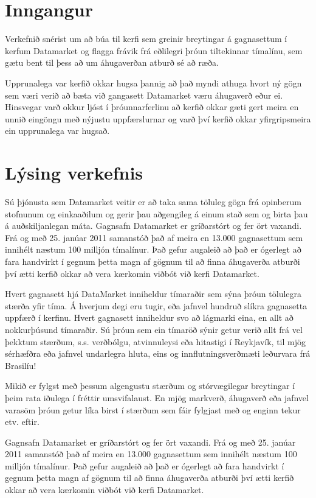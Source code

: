\documentclass{article}
\begin{document}
\tableofcontents
\newpage

\section{Inngangur}

Verkefnið snérist um að búa til kerfi sem greinir
breytingar á gagnasettum í kerfum Datamarket og flagga
frávik frá eðlilegri þróun tiltekinnar tímalínu, sem
gætu bent til þess að um áhugaverðan atburð sé að ræða.

Upprunalega var kerfið okkar hugsa þannig að það myndi
athuga hvort ný gögn sem væri verið að bæta við
gangasett Datamarket væru áhugaverð eður ei. Hinsvegar
varð okkur ljóst í þróunnarferlinu að kerfið okkar gæti
gert meira en unnið eingöngu með nýjustu uppfærslurnar
og varð því kerfið okkar yfirgripsmeira ein upprunalega
var hugsað.

\newpage
\section{Lýsing verkefnis}

Sú þjónusta sem Datamarket veitir er að taka sama töluleg gögn frá opinberum
stofnunum og einkaaðilum og gerir þau aðgengileg á einum stað sem og birta þau á
auðskiljanlegan máta. Gagnsafn Datamarket er gríðarstórt og fer ört vaxandi. Frá
og með 25. janúar 2011 samanstóð það af meira en 13.000 gagnasettum sem innihélt
næstum 100 milljón tímalínur. Það gefur augaleið að það er ógerlegt að fara
handvirkt í gegnum þetta magn af gögnum til að finna áhugaverða atburði því ætti
kerfið okkar að vera kærkomin viðbót við kerfi Datamarket.

Hvert gagnasett hjá DataMarket inniheldur tímaraðir sem sýna þróun tölulegra stærða yfir tíma. Á hverjum degi eru tugir, eða jafnvel hundruð slíkra gagnasetta uppfærð í kerfinu. Hvert gagnasett inniheldur svo að lágmarki eina, en allt að nokkurþúsund tímaraðir. Sú
þróun sem ein tímaröð sýnir getur verið allt frá vel
þekktum stærðum, s.s. verðbólgu, atvinnuleysi eða
hitastigi í Reykjavík, til mjög sérhæfðra eða jafnvel
undarlegra hluta, eins og innflutningsverðmæti
leðurvara frá Brasilíu!

Mikið er fylgst með þessum algengustu stærðum og
stórvægilegar breytingar í þeim rata iðulega í fréttir
umsvifalaust. En mjög markverð, áhugaverð eða jafnvel
varasöm þróun getur líka birst í stærðum sem fáir
fylgjast með og enginn tekur etv. eftir.

Gagnsafn Datamarket er gríðarstórt og fer ört vaxandi. Frá og með 25. janúar 2011 samanstóð það af meira en 13.000 gagnasettum sem innihélt næstum 100 milljón tímalínur. Það gefur augaleið að það er ógerlegt að fara handvirkt í gegnum þetta magn af gögnum til að finna áhugaverða atburði því ætti kerfið okkar að vera kærkomin viðbót við kerfi Datamarket.
\end{document}

